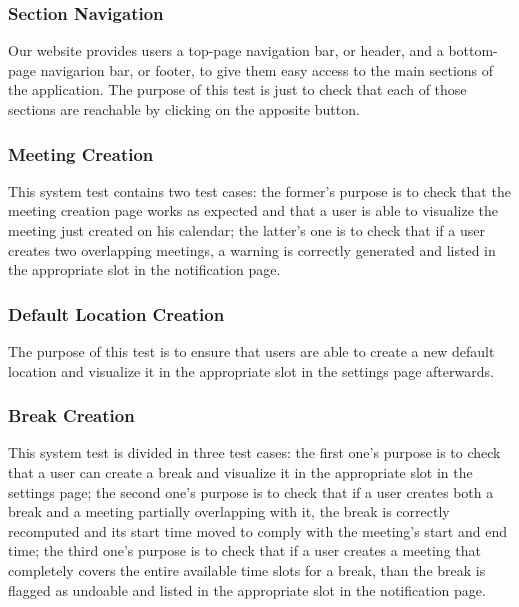 \subsubsection*{Section Navigation}
Our website provides users a top-page navigation bar, or header, and a bottom-page navigarion bar, or footer, to give them easy access to the main sections of the \projectname application. The purpose of this test is just to check that each of those sections are reachable by clicking on the apposite button.

\subsubsection*{Meeting Creation}
This system test contains two test cases: the former's purpose is to check that the meeting creation page works as expected and that a user is able to visualize the meeting just created on his calendar; the latter's one is to check that if a user creates two overlapping meetings, a warning is correctly generated and listed in the appropriate slot in the notification page.

\subsubsection*{Default Location Creation}
The purpose of this test is to ensure that users are able to create a new default location and visualize it in the appropriate slot in the settings page afterwards.

\subsubsection*{Break Creation}
This system test is divided in three test cases: the first one's purpose is to check that a user can create a break and visualize it in the appropriate slot in the settings page; the second one's purpose is to check that if a user creates both a break and a meeting partially overlapping with it, the break is correctly recomputed and its start time moved to comply with the meeting's start and end time; the third one's purpose is to check that if a user creates a meeting that completely covers the entire available time slots for a break, than the break is flagged as undoable and listed in the appropriate slot in the notification page.